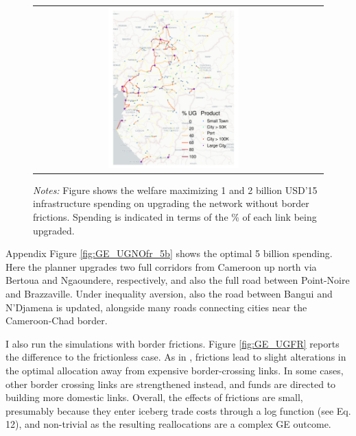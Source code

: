 \documentclass[a4paper]{article}
\begin{document}
\begin{figure}[H]
{\begin{tabular}{cc}
\includegraphics[width=0.48\textwidth]{"../figures/GE/trans_africa_network_GE_20g_2b_fixed_cgc_sigma3.8_rho2_julia_google_perc_ug.pdf"}
\end{tabular}
}
\scriptsize 
\emph{Notes:} Figure shows the welfare maximizing 1 and 2 billion USD'15 infrastructure spending on upgrading the network without border frictions. Spending is indicated in terms of the \% of each link being upgraded.  
\end{figure}

Appendix Figure \ref{fig:GE_UGNOfr_5b} shows the optimal 5 billion spending. Here the planner upgrades two full corridors from Cameroon up north via Bertoua and Ngaoundere, respectively, and also the full road between Point-Noire and Brazzaville. Under inequality aversion, also the road between Bangui and N'Djamena is updated, alongside many roads connecting cities near the Cameroon-Chad border. \newline  

I also run the simulations with border frictions. Figure \ref{fig:GE_UGFR} reports the difference to the frictionless case. As in \citet{krantz2024optimal}, frictions lead to slight alterations in the optimal allocation away from expensive border-crossing links. In some cases, other border crossing links are strengthened instead, and funds are directed to building more domestic links. Overall, the effects of frictions are small, presumably because they enter iceberg trade costs through a log function (see \citet{krantz2024optimal} Eq. 12), and non-trivial as the resulting reallocations are a complex GE outcome. %
\end{document}
